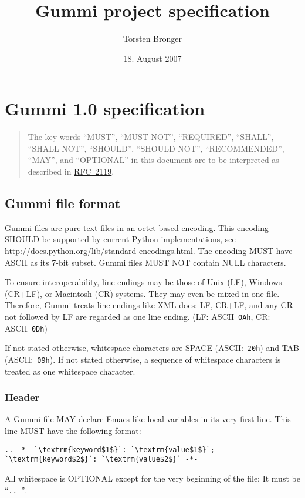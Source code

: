 \documentclass[12pt,openany]{book}
\begin{document}
\title{Gummi project specification}
\author{Torsten Bronger}
\date{18. August 2007}
\maketitle

\tableofcontents

\chapter{Gummi 1.0 specification}

\begin{quotation}
  The key words ``MUST'', ``MUST NOT'', ``REQUIRED'', ``SHALL'', ``SHALL NOT'',
  ``SHOULD'', ``SHOULD NOT'', ``RECOMMENDED'', ``MAY'', and ``OPTIONAL'' in
  this document are to be interpreted as described in
  \href{http://tools.ietf.org/html/rfc2119}{RFC~2119}.
\end{quotation}
      
\section{Gummi file format}

Gummi files are pure text files in an octet-based encoding.  This encoding
SHOULD be supported by current Python implementations, see
\url{http://docs.python.org/lib/standard-encodings.html}.  The encoding MUST
have ASCII as its \mbox{7-bit} subset.  Gummi files MUST NOT contain NULL
characters.

To ensure interoperability, line endings may be those of Unix (LF), Windows
(CR+LF), or Macintosh (CR) systems.  They may even be mixed in one file.
Therefore, Gummi treats line endings like XML does: LF, CR+LF, and any CR not
followed by LF are regarded as one line ending.  (LF: ASCII~\verb|0Ah|, CR:
ASCII~\verb|0Dh|)

If not stated otherwise, whitespace characters are SPACE (ASCII:~\verb|20h|)
and TAB (ASCII:~\verb|09h|).  If not stated otherwise, a sequence of whitespace
characters is treated as one whitespace character.

\subsection{Header}

A Gummi file MAY declare Emacs-like local variables in its very first line.
This line MUST have the following format:
\begin{lstlisting}[escapechar=`]
.. -*- `\textrm{keyword$1$}`: `\textrm{value$1$}`; `\textrm{keyword$2$}`: `\textrm{value$2$}` -*-
\end{lstlisting}
All whitespace is OPTIONAL except for the very beginning of the file: It must
be ``\verb*|.. |''.
\end{document}
